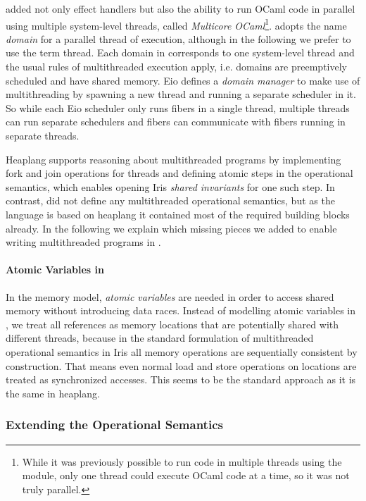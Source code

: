 \ocf{} added not only effect handlers but also the ability to run OCaml code in parallel using multiple system-level threads, called \emph{Multicore OCaml}\footnote{While it was previously possible to run code in multiple threads using the  module, only one thread could execute OCaml code at a time, so it was not truly parallel.}.
\ocf{} adopts the name \emph{domain} for a parallel thread of execution, although in the following we prefer to use the term thread.
Each domain in \ocf{} corresponds to one system-level thread and the usual rules of multithreaded execution apply, i.e. domains are preemptively scheduled and have shared memory.
Eio defines a \emph{domain manager} to make use of multithreading by spawning a new thread and running a separate scheduler in it.
So while each Eio scheduler only runs fibers in a single thread, multiple threads can run separate schedulers and fibers can communicate with fibers running in separate threads.

Heaplang supports reasoning about multithreaded programs by implementing fork and join operations for threads and defining atomic steps in the operational semantics, which enables opening Iris \emph{shared invariants} for one such step.
In contrast, \hh{} did not define any multithreaded operational semantics, but as the language is based on heaplang it contained most of the required building blocks already.
In the following we explain which missing pieces we added to enable writing multithreaded programs in \hh{}.

\paragraph*{Atomic Variables in \ocf{}}
In the \ocf{} memory model, \emph{atomic variables} are needed in order to access shared memory without introducing data races.
Instead of modelling atomic variables in \hh{}, we treat all references as memory locations that are potentially shared with different threads, 
because in the standard formulation of multithreaded operational semantics in Iris all memory operations are sequentially consistent by construction. 
That means even normal load and store operations on locations are treated as synchronized accesses.
This seems to be the standard approach as it is the same in heaplang.

\subsubsection*{Extending the Operational Semantics}

